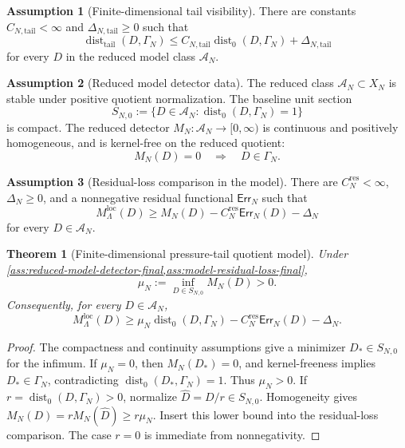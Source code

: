 \documentclass[11pt]{article}
\numberwithin{equation}{section}
\newtheorem{theorem}{Theorem}[section]
\theoremstyle{definition}
\newtheorem{assumption}[assumption]{Assumption}
\theoremstyle{remark}
\newcommand{\loc}{\mathrm{loc}}
\newcommand{\tail}{\mathrm{tail}}
\newcommand{\res}{\mathrm{res}}
\newcommand{\Err}{\mathsf{Err}}
\newcommand{\Dist}{\operatorname{dist}}
\newcommand{\calA}{\mathcal A}
\begin{document}
\begin{assumption}[Finite-dimensional tail visibility]\label{ass:finite-tail-vis-final}
There are constants \(C_{N,\tail}<\infty\) and \(\Delta_{N,\tail}\ge 0\) such that
\[
        \Dist_{\tail}(D,\Gamma_N)
        \le
        C_{N,\tail}\Dist_0(D,\Gamma_N)+\Delta_{N,\tail}
\]
for every \(D\) in the reduced model class \(\calA_N\).
\end{assumption}

\begin{assumption}[Reduced model detector data]\label{ass:reduced-model-detector-final}
The reduced class \(\calA_N\subset X_N\) is stable under positive quotient normalization.  The baseline unit section
\[
        S_{N,0}:=\{D\in\calA_N:\Dist_0(D,\Gamma_N)=1\}
\]
is compact.  The reduced detector \(M_N:\calA_N\to[0,\infty)\) is continuous and positively homogeneous, and is kernel-free on the reduced quotient:
\[
        M_N(D)=0\quad\Longrightarrow\quad D\in\Gamma_N.
\]
\end{assumption}

\begin{assumption}[Residual-loss comparison in the model]\label{ass:model-residual-loss-final}
There are \(C_N^{\res}<\infty\), \(\Delta_N\ge 0\), and a nonnegative residual functional \(\Err_N\) such that
\[
        M_\Lambda^{\loc}(D)
        \ge
        M_N(D)-C_N^{\res}\Err_N(D)-\Delta_N
\]
for every \(D\in\calA_N\).
\end{assumption}

\begin{theorem}[Finite-dimensional pressure-tail quotient model]\label{thm:finite-dimensional-model-final}
Under \cref{ass:reduced-model-detector-final,ass:model-residual-loss-final},
\[
        \mu_N:=\inf_{D\in S_{N,0}}M_N(D)>0.
\]
Consequently, for every \(D\in\calA_N\),
\[
        M_\Lambda^{\loc}(D)
        \ge
        \mu_N\Dist_0(D,\Gamma_N)-C_N^{\res}\Err_N(D)-\Delta_N.
\]
\end{theorem}

\begin{proof}
The compactness and continuity assumptions give a minimizer \(D_*\in S_{N,0}\) for the infimum.  If \(\mu_N=0\), then \(M_N(D_*)=0\), and kernel-freeness implies \(D_*\in\Gamma_N\), contradicting \(\Dist_0(D_*,\Gamma_N)=1\).  Thus \(\mu_N>0\).  If \(r=\Dist_0(D,\Gamma_N)>0\), normalize \(\widehat D=D/r\in S_{N,0}\).  Homogeneity gives \(M_N(D)=rM_N(\widehat D)\ge r\mu_N\).  Insert this lower bound into the residual-loss comparison.  The case \(r=0\) is immediate from nonnegativity.
\end{proof}
\end{document}
